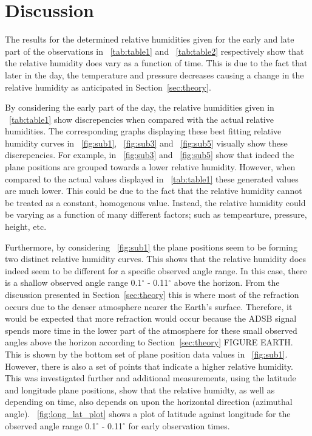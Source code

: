 \documentclass{article}
\newcommand{\figref}[2][\figurename~]{#1\ref{#2}}
\newcommand{\tabref}[2][\tablename~]{#1\ref{#2}}
\newcommand{\secref}[2][Section~]{#1\ref{#2}}
\begin{document}
\section{Discussion}
\label{sec:discussion}

The results for the determined relative humidities given for the early and late part of the observations in \tabref{tab:table1} and \tabref{tab:table2} respectively show that the relative humidity does vary as a function of time. This is due to the fact that later in the day, the temperature and pressure decreases causing a change in the relative humidity as anticipated in \secref{sec:theory}.

\vspace{2mm}
\noindent
By considering the early part of the day, the relative humidities given in \tabref{tab:table1} show discrepencies when compared with the actual relative humidities. The corresponding graphs displaying these best fitting relative humidity curves in \figref{fig:sub1}, \figref{fig:sub3} and \figref{fig:sub5} visually show these discrepencies. For example, in \figref{fig:sub3} and \figref{fig:sub5} show that indeed the plane positions are grouped towards a lower relative humidity. However, when compared to the actual values displayed in \tabref{tab:table1} these generated values are much lower. This could be due to the fact that the relative humidity cannot be treated as a constant, homogenous value. Instead, the relative humidity could be varying as a function of many different factors; such as tempearture, pressure, height, etc. 

\vspace{2mm}
\noindent
Furthermore, by considering \figref{fig:sub1} the plane positions seem to be forming two distinct relative humidity curves. This shows that the relative humidity does indeed seem to be different for a specific observed angle range. In this case, there is a shallow observed angle range 0.1$^{\circ}$ - 0.11$^{\circ}$ above the horizon. From the discussion presented in \secref{sec:theory} this is where most of the refraction occurs due to the denser atmosphere nearer the Earth's surface. Therefore, it would be expected that more refraction would occur because the ADSB signal spends more time in the lower part of the atmosphere for these small observed angles above the horizon according to \secref{sec:theory} FIGURE EARTH. This is shown by the bottom set of plane position data values in \figref{fig:sub1}. However, there is also a set of points that indicate a higher relative humidity. This was investigated further and additional measurements, using the latitude and longitude plane positions, show that the relative humidty, as well as depending on time, also depends on upon the horizontal direction (azimuthal angle). \figref{fig:long_lat_plot} shows a plot of latitude against longitude for the observed angle range 0.1$^{\circ}$ - 0.11$^{\circ}$ for early observation times.
\end{document}
